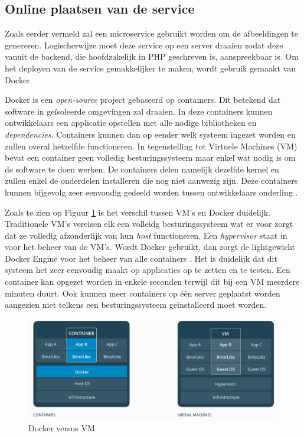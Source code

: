 \subsection{Online plaatsen van de service}
Zoals eerder vermeld zal een microservice gebruikt worden om de afbeeldingen te genereren. Logischerwijze moet deze service op een server draaien zodat deze vanuit de backend, die hoofdzakelijk in PHP geschreven is, aanspreekbaar is. Om het deployen van de service gemakkelijker te maken, wordt gebruik gemaakt van Docker. 

Docker is een \textit{open-source} project gebaseerd op containers. Dit betekend dat software in ge\"{i}soleerde omgevingen zal draaien. In deze containers kunnen ontwikkelaars een applicatie opstellen met alle nodige bibliotheken en \textit{dependencies}. Containers kunnen dan op eender welk systeem ingezet worden en zullen overal hetzelfde functioneren. In tegenstelling tot Virtuele Machines (VM) bevat een container geen volledig besturingssysteem maar enkel wat nodig is om de software te doen werken. De containers delen namelijk dezelfde kernel en zullen enkel de onderdelen installeren die nog niet aanwezig zijn. Deze containers kunnen bijgevolg zeer eenvoudig gedeeld worden tussen ontwikkelaars onderling \cite{DockerWhatDocker}. 

Zoals te zien op Figuur \ref{fig:DockerDiagram} is het verschil tussen VM's en Docker duidelijk. Traditionele VM's vereisen elk een volleidg besturingssysteem wat er voor zorgt dat ze volledig afzonderlijk van hun \textit{host} functioneren. Een \textit{hypervisor} staat in voor het beheer van de VM's. Wordt Docker gebruikt, dan zorgt de lightgewicht Docker Engine voor het beheer van alle containers \cite{OpenSourceWhatDocker}. Het is duidelijk dat dit systeem het zeer eenvoudig maakt op applicaties op te zetten en te testen. Een container kan opgezet worden in enkele seconden terwijl dit bij een VM meerdere minuten duurt. Ook kunnen meer containers op \'{e}\'{e}n server geplaatst worden aangezien niet telkens een besturingssysteem ge\"{i}nstalleerd moet worden. 

\begin{figure}[H]
	\centering
	\includegraphics[width=1\textwidth]{Figuren/DockerDiagram.png}
	\caption{Docker versus VM \cite{DockerDiagram}}
	\label{fig:DockerDiagram}
\end{figure}

